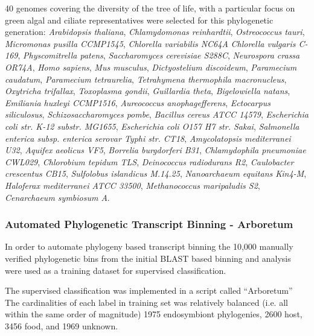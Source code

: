 40 genomes covering the diversity of the tree of life, with a particular focus on green algal and ciliate representatives 
were selected for this phylogenetic generation: 
\textit{Arabidopsis thaliana}, \textit{Chlamydomonas reinhardtii},
\textit{Ostreococcus tauri}, \textit{Micromonas pusilla CCMP1545},  \textit{Chlorella variabilis NC64A}
\textit{Chlorella vulgaris C-169}, \textit{Physcomitrella patens}, \textit{Saccharomyces cerevisiae S288C}, 
\textit{Neurospora crassa OR74A},
\textit{Homo sapiens},
\textit{Mus musculus},
\textit{Dictyostelium discoideum},
\textit{Paramecium caudatum},
\textit{Paramecium tetraurelia},
\textit{Tetrahymena thermophila macronucleus},
\textit{Oxytricha trifallax},
\textit{Toxoplasma gondii},
\textit{Guillardia theta},
\textit{Bigelowiella natans},
\textit{Emiliania huxleyi CCMP1516},
\textit{Aureococcus anophagefferens},
\textit{Ectocarpus siliculosus},
\textit{Schizosaccharomyces pombe},
\textit{Bacillus cereus ATCC 14579},
\textit{Escherichia coli str. K-12 substr. MG1655},
\textit{Escherichia coli O157 H7 str. Sakai},
\textit{Salmonella enterica subsp. enterica serovar Typhi str. CT18},
\textit{Amycolatopsis mediterranei U32},
\textit{Aquifex aeolicus VF5},
\textit{Borrelia burgdorferi B31},
\textit{Chlamydophila pneumoniae CWL029},
\textit{Chlorobium tepidum TLS},
\textit{Deinococcus radiodurans R2},
\textit{Caulobacter crescentus CB15},
\textit{Sulfolobus islandicus M.14.25},
\textit{Nanoarchaeum equitans Kin4-M},
\textit{Haloferax mediterranei ATCC 33500},
\textit{Methanococcus maripaludis S2},
\textit{Cenarchaeum symbiosum A}.

\subsubsection{Automated Phylogenetic Transcript Binning - Arboretum}
In order to automate phylogeny based transcript binning the 10,000
manually verified phylogenetic bins from the initial BLAST based binning
and analysis were used as a training dataset for supervised classification.

The supervised classification was implemented in a script called ``Arboretum''
The cardinalities of each label in training set was relatively balanced (i.e. all within
the same order of magnitude) 1975 endosymbiont phylogenies, 2600 host, 3456 food, and 1969
unknown. 

